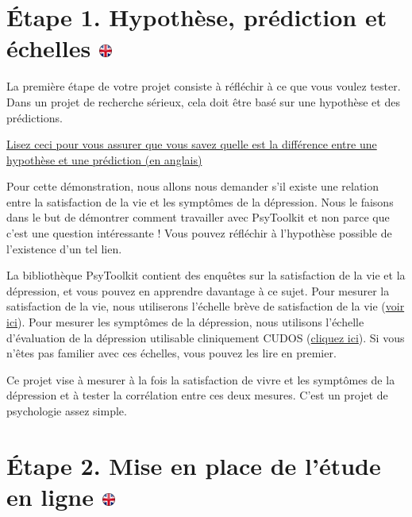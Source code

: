 \documentclass[
]{book}
\begin{document}
\hypertarget{uxe9tape-1.-hypothuxe8se-pruxe9diction-et-uxe9chelles}{%
\section[Étape 1. Hypothèse, prédiction et échelles
]{\texorpdfstring{Étape 1. Hypothèse, prédiction et échelles
\href{https://www.psytoolkit.org/lessons/questionnaire-project.html\#_step_1_hypothesis_prediction_and_scales}{\protect\includegraphics{img/ukflag.png}}}{Étape 1. Hypothèse, prédiction et échelles }}\label{uxe9tape-1.-hypothuxe8se-pruxe9diction-et-uxe9chelles}}

La première étape de votre projet consiste à réfléchir à ce que vous
voulez tester. Dans un projet de recherche sérieux, cela doit être basé
sur une hypothèse et des prédictions.

\href{http://datanuggets.org/wp-content/uploads/2014/01/Strode_NABT-2011-Hypothesis-Presentation.pdf}{Lisez
ceci pour vous assurer que vous savez quelle est la différence entre une
hypothèse et une prédiction (en anglais)}

Pour cette démonstration, nous allons nous demander s'il existe une
relation entre la satisfaction de la vie et les symptômes de la
dépression. Nous le faisons dans le but de démontrer comment travailler
avec PsyToolkit et non parce que c'est une question intéressante ! Vous
pouvez réfléchir à l'hypothèse possible de l'existence d'un tel lien.

La bibliothèque PsyToolkit contient des enquêtes sur la satisfaction de
la vie et la dépression, et vous pouvez en apprendre davantage à ce
sujet. Pour mesurer la satisfaction de la vie, nous utiliserons
l'échelle brève de satisfaction de la vie
(\href{http://www.psytoolkit.org/survey-library/satisfaction-with-life.html}{voir
ici}). Pour mesurer les symptômes de la dépression, nous utilisons
l'échelle d'évaluation de la dépression utilisable cliniquement CUDOS
(\href{http://www.psytoolkit.org/survey-library/depression-cudos.html}{cliquez
ici}). Si vous n'êtes pas familier avec ces échelles, vous pouvez les
lire en premier.

Ce projet vise à mesurer à la fois la satisfaction de vivre et les
symptômes de la dépression et à tester la corrélation entre ces deux
mesures. C'est un projet de psychologie assez simple.

\hypertarget{uxe9tape-2.-mise-en-place-de-luxe9tude-en-ligne}{%
\section[Étape 2. Mise en place de l'étude en ligne
]{\texorpdfstring{Étape 2. Mise en place de l'étude en ligne
\href{https://www.psytoolkit.org/lessons/questionnaire-project.html\#_step_2_setup_online_study}{\protect\includegraphics{img/ukflag.png}}}{Étape 2. Mise en place de l'étude en ligne }}\label{uxe9tape-2.-mise-en-place-de-luxe9tude-en-ligne}}
\end{document}
